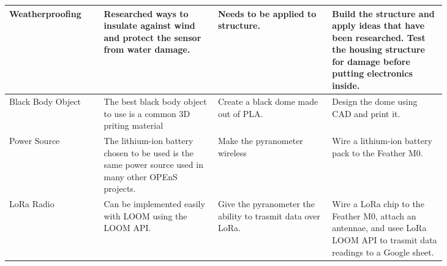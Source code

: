 \documentclass[10pt,draftclsnofoot,onecolumn,letterpaper]{article}
\begin{document}
\begin{longtable}{| p{0.17\linewidth} | p{0.22\linewidth} | p{0.22\linewidth} | p{0.22\linewidth} |}
         \hline Weatherproofing & Researched ways to insulate against wind and protect the sensor from water damage. & Needs to be applied to structure. & Build the structure and apply ideas that have been researched. Test the housing structure for damage before putting electronics inside. \\
         \hline Black Body Object & The best black body object to use is a common 3D priting material & Create a black dome made out of PLA. & Design the dome using CAD and print it. \\
         \hline Power Source & The lithium-ion battery chosen to be used is the same power source used in many other OPEnS projects. & Make the pyranometer wireless & Wire a lithium-ion battery pack to the Feather M0. \\
         \hline LoRa Radio & Can be implemented easily with LOOM using the LOOM API. & Give the pyranometer the ability to trasmit data over LoRa. & Wire a LoRa chip to the Feather M0, attach an antennae, and usee LoRa LOOM API to trasmit data readings to a Google sheet. \\
         \hline
    \end{longtable}
\end{document}

